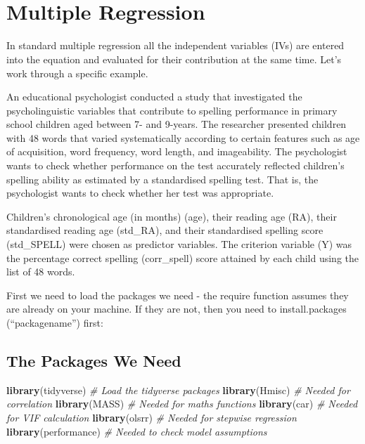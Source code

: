 \documentclass[
]{book}
\newenvironment{Shaded}{\begin{snugshade}}{\end{snugshade}}
\newcommand{\CommentTok}[1]{\textcolor[rgb]{0.56,0.35,0.01}{\textit{#1}}}
\newcommand{\FunctionTok}[1]{\textcolor[rgb]{0.13,0.29,0.53}{\textbf{#1}}}
\newcommand{\NormalTok}[1]{#1}
\begin{document}
~~

~~

\hypertarget{multiple-regression}{%
\section{Multiple Regression}\label{multiple-regression}}

In standard multiple regression all the independent variables (IVs) are entered into the equation and evaluated for their contribution at the same time. Let's work through a specific example.

An educational psychologist conducted a study that investigated the psycholinguistic variables that contribute to spelling performance in primary school children aged between 7- and 9-years. The researcher presented children with 48 words that varied systematically according to certain features such as age of acquisition, word frequency, word length, and imageability. The psychologist wants to check whether performance on the test accurately reflected children's spelling ability as estimated by a standardised spelling test. That is, the psychologist wants to check whether her test was appropriate.

Children's chronological age (in months) (age), their reading age (RA), their standardised reading age (std\_RA), and their standardised spelling score (std\_SPELL) were chosen as predictor variables. The criterion variable (Y) was the percentage correct spelling (corr\_spell) score attained by each child using the list of 48 words.

First we need to load the packages we need - the require function assumes they are already on your machine. If they are not, then you need to install.packages (``packagename'') first:

\hypertarget{the-packages-we-need-1}{%
\subsection{The Packages We Need}\label{the-packages-we-need-1}}

\begin{Shaded}
\begin{Highlighting}[]
\FunctionTok{library}\NormalTok{(tidyverse) }\CommentTok{\# Load the tidyverse packages}
\FunctionTok{library}\NormalTok{(Hmisc) }\CommentTok{\# Needed for correlation}
\FunctionTok{library}\NormalTok{(MASS) }\CommentTok{\# Needed for maths functions}
\FunctionTok{library}\NormalTok{(car) }\CommentTok{\# Needed for VIF calculation}
\FunctionTok{library}\NormalTok{(olsrr) }\CommentTok{\# Needed for stepwise regression }
\FunctionTok{library}\NormalTok{(performance) }\CommentTok{\# Needed to check model assumptions}
\end{Highlighting}
\end{Shaded}
\end{document}
